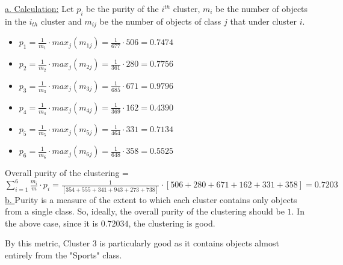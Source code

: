 \documentclass[11pt]{article}
\begin{document}
\underline{a. Calculation:}
Let $p_i$ be the purity of the $i^{th}$ cluster, $m_i$ be the number of objects in the $i_{th}$ cluster and $m_{ij}$ be the number of objects of class $j$ that under cluster $i$.

\begin{itemize}
	\item $p_1 = \frac{1}{m_1} \cdot max_{j}(m_{1j}) = \frac{1}{677} \cdot 506 = 0.7474$
	\item $p_2 = \frac{1}{m_2} \cdot max_{j}(m_{2j}) = \frac{1}{361} \cdot 280 = 0.7756$
	\item $p_3 = \frac{1}{m_3} \cdot max_{j}(m_{3j}) = \frac{1}{685} \cdot 671 = 0.9796$
	\item $p_4 = \frac{1}{m_4} \cdot max_{j}(m_{4j}) = \frac{1}{369} \cdot 162 = 0.4390$
	\item $p_5 = \frac{1}{m_5} \cdot max_{j}(m_{5j}) = \frac{1}{464} \cdot 331 = 0.7134$
	\item $p_6 = \frac{1}{m_6} \cdot max_{j}(m_{6j}) = \frac{1}{648} \cdot 358 = 0.5525$
\end{itemize}	

Overall purity of the clustering = $\sum^{6}_{i = 1} \frac{m_i}{m} \cdot p_i = \frac{1}{[354 + 555 + 341 + 943 + 273 + 738]} \cdot [506 + 280 + 671 + 162 + 331 + 358] = 0.7203$
\\

\underline{b. }
Purity is a measure of the extent to which each cluster contains only objects from a single class. So, ideally, the overall purity of the clustering should be $1$. In the above case, since it is $0.72034$, the clustering is good.

By this metric, Cluster 3 is particularly good as it contains objects almost entirely from the "Sports" class.
	
	
	
\end{document}
